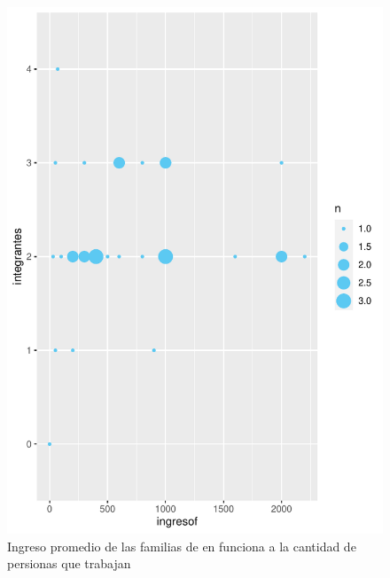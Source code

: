 \documentclass[12pt]{article}\usepackage[]{graphicx}\usepackage[]{xcolor}
\makeatletter
\def\maxwidth{ %
  \ifdim\Gin@nat@width>\linewidth
    \linewidth
  \else
    \Gin@nat@width
  \fi
}
\newenvironment{kframe}{%
 \def\at@end@of@kframe{}%
 \ifinner\ifhmode%
  \def\at@end@of@kframe{\end{minipage}}%
  \begin{minipage}{\columnwidth}%
 \fi\fi%
 \def\FrameCommand##1{\hskip\@totalleftmargin \hskip-\fboxsep
 \colorbox{shadecolor}{##1}\hskip-\fboxsep
     \hskip-\linewidth \hskip-\@totalleftmargin \hskip\columnwidth}%
 \MakeFramed {\advance\hsize-\width
   \@totalleftmargin\z@ \linewidth\hsize
   \@setminipage}}%
 {\par\unskip\endMakeFramed%
 \at@end@of@kframe}
\newenvironment{knitrout}{}{} %
\makeatother
\begin{document}
	\begin{figure}[H]
	\centering
\begin{knitrout}
\color{fgcolor}\begin{kframe}


{\ttfamily\noindent\color{warningcolor}{\#\# Warning: Removed 1 rows containing non-finite values (`stat\_sum()`).}}\end{kframe}
\includegraphics[width=\maxwidth]{figure/nose-1} 
\end{knitrout}
	\caption{Ingreso promedio de las familias de \comunidad en funciona a la cantidad de persionas que trabajan}
	\end{figure}
	
	
	
\end{document}
